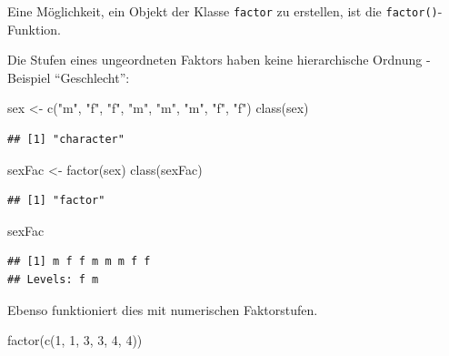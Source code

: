 \documentclass[
]{book}
\newenvironment{Shaded}{\begin{snugshade}}{\end{snugshade}}
\newcommand{\DecValTok}[1]{\textcolor[rgb]{0.00,0.00,0.81}{#1}}
\newcommand{\FunctionTok}[1]{\textcolor[rgb]{0.00,0.00,0.00}{#1}}
\newcommand{\NormalTok}[1]{#1}
\newcommand{\OtherTok}[1]{\textcolor[rgb]{0.56,0.35,0.01}{#1}}
\newcommand{\StringTok}[1]{\textcolor[rgb]{0.31,0.60,0.02}{#1}}
\begin{document}
Eine Möglichkeit, ein Objekt der Klasse \texttt{factor} zu erstellen, ist die \texttt{factor()}-Funktion.

Die Stufen eines ungeordneten Faktors haben keine hierarchische Ordnung - Beispiel ``Geschlecht'':

\begin{Shaded}
\begin{Highlighting}[]
\NormalTok{sex }\OtherTok{\textless{}{-}} \FunctionTok{c}\NormalTok{(}\StringTok{"m"}\NormalTok{, }\StringTok{"f"}\NormalTok{, }\StringTok{"f"}\NormalTok{, }\StringTok{"m"}\NormalTok{, }\StringTok{"m"}\NormalTok{, }\StringTok{"m"}\NormalTok{, }\StringTok{"f"}\NormalTok{, }\StringTok{"f"}\NormalTok{)}
\FunctionTok{class}\NormalTok{(sex)}
\end{Highlighting}
\end{Shaded}

\begin{verbatim}
## [1] "character"
\end{verbatim}

\begin{Shaded}
\begin{Highlighting}[]
\NormalTok{sexFac  }\OtherTok{\textless{}{-}}  \FunctionTok{factor}\NormalTok{(sex)}
\FunctionTok{class}\NormalTok{(sexFac)}
\end{Highlighting}
\end{Shaded}

\begin{verbatim}
## [1] "factor"
\end{verbatim}

\begin{Shaded}
\begin{Highlighting}[]
\NormalTok{sexFac }
\end{Highlighting}
\end{Shaded}

\begin{verbatim}
## [1] m f f m m m f f
## Levels: f m
\end{verbatim}

Ebenso funktioniert dies mit numerischen Faktorstufen.

\begin{Shaded}
\begin{Highlighting}[]
\FunctionTok{factor}\NormalTok{(}\FunctionTok{c}\NormalTok{(}\DecValTok{1}\NormalTok{, }\DecValTok{1}\NormalTok{, }\DecValTok{3}\NormalTok{, }\DecValTok{3}\NormalTok{, }\DecValTok{4}\NormalTok{, }\DecValTok{4}\NormalTok{))}
\end{Highlighting}
\end{Shaded}
\end{document}
